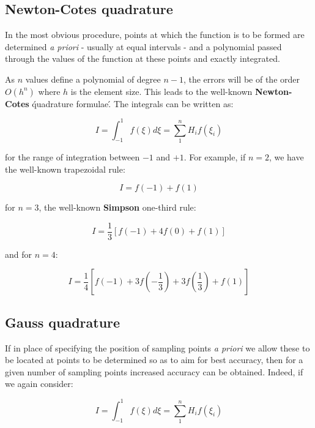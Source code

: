 \documentclass[10pt,b5paper,titlepage]{book}
\begin{document}
\subsection{Newton-Cotes quadrature}
In the most obvious procedure, points at which the function is to be formed are
determined \textit{a priori} - usually at equal intervals - and a polynomial
passed through the values of the function at these points and exactly integrated.

As $ n $ values define a polynomial of degree $ n - 1 $, the errors will be
of the order $ O(h^n) $ where $ h $ is the element size. This leads to the
well-known \textbf{Newton-Cotes} \'quadrature formulae\'. The integrals can be
written as:

\begin{equation}
    I = \int_{-1}^{1} f(\xi) d\xi = \sum_1^n H_i f(\xi_i)
\end{equation}

for the range of integration between $ -1 $ and $ +1 $. For example, if $ n = 2 $,
we have the well-known trapezoidal rule:

\begin{equation}
    I = f(-1) + f(1)
\end{equation}

for $ n = 3 $, the well-known \textbf{Simpson} one-third rule:

\begin{equation}
    I = \frac{1}{3} \left[ f(-1) + 4f(0) + f(1) \right]
\end{equation}

and for $ n = 4 $:

\begin{equation}
    I = \frac{1}{4} \left[f(-1) + 3f(-\frac{1}{3}) + 3f(\frac{1}{3}) + f(1) \right]
\end{equation}


\subsection{Gauss quadrature}

If in place of specifying the position of sampling points \textit{a priori} we
allow these to be located at points to be determined so as to aim for best
accuracy, then for a given number of sampling points increased accuracy can be
obtained. Indeed, if we again consider:

\begin{equation}
    I = \int_{-1}^{1} f(\xi) d\xi = \sum_1^n H_i f(\xi_i)
\end{equation}
\end{document}
